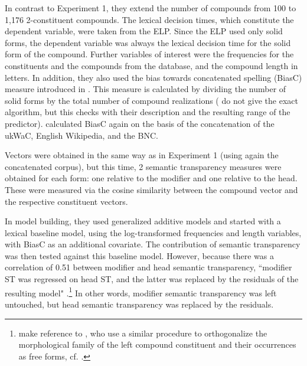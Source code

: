 In contrast to Experiment 1, they extend the number of compounds from
100 to 1,176 2-constituent
compounds. The lexical decision times, which constitute the dependent variable, were
taken from the ELP. Since the ELP used only solid forms, the dependent
variable was always the lexical decision time for the solid form of
the compound. Further variables of interest were the frequencies for
the constituents and the compounds from the  database, and the
compound length in letters. In
addition, they also used the bias towards concatenated spelling (BiasC) measure introduced in
\citet[954]{KupermanandBertram:2013}. This measure is calculated by
dividing the number of solid forms by the total number of
compound realizations (\citealt[954]{KupermanandBertram:2013} do not
give the exact algorithm, but this checks with their description and
the resulting range of the predictor). \citet{Marellietal:2014}
calculated BiasC again on the basis of the concatenation of the
ukWaC, English Wikipedia, and the BNC.

Vectors were obtained in the same way as in Experiment 1 (using again
the concatenated corpus), but this
time, 2 semantic transparency measures were obtained for each form:
one relative to the modifier and one relative to the head. These
were measured via the cosine similarity between the compound vector
and the respective constituent vectors.

In model building, they used generalized additive models and started
with a lexical baseline model, using the log-transformed frequencies and length
variables, with BiasC as an additional covariate. The contribution of
semantic transparency was then tested against this baseline
model. However, because there was a correlation of 0.51 between
modifier and head semantic transparency, ``modifier ST was regressed on head
ST, and the latter was replaced by the residuals of the resulting
model"
\citep[1429]{Marellietal:2014}.\footnote{\citet[1429]{Marellietal:2014} make
reference to \citet{Kupermanetal:2009}, who use a similar procedure to
orthogonalize the morphological family of the left compound
constituent and their occurrences as free forms, cf.
\citet[879]{Kupermanetal:2009}.} In other words, modifier
semantic transparency was left untouched, but head semantic
transparency was replaced by the residuals. 

